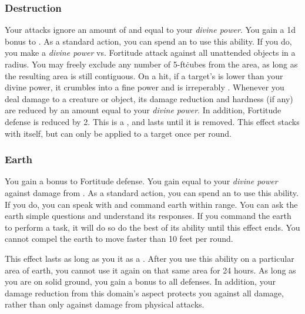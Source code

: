         \subsubsection{Destruction}
             Your attacks ignore an amount of  and  equal to your \textit{divine power}.
             You gain a \plus1d bonus to .
             As a standard action, you can spend an  to use this ability.
            If you do, you make a \textit{divine power} vs. Fortitude attack against all unattended objects in a \arealarge radius.
            You may freely exclude any number of 5-ft\. cubes from the area, as long as the resulting area is still contiguous.
            On a hit, if a target's  is lower than your divine power, it crumbles into a fine power and is irreperably .
             Whenever you deal damage to a creature or object, its damage reduction and hardness (if any) are reduced by an amount equal to your \textit{divine power}.
            In addition, Fortitude defense is reduced by 2.
            This is a , and lasts until it is removed.
            This effect stacks with itself, but can only be applied to a target once per round.

        \subsubsection{Earth}
             You gain a  bonus to Fortitude defense.
             You gain  equal to your \textit{divine power} against damage from .
             As a standard action, you can spend an  to use this ability.
            If you do, you can speak with and command earth within \rnglong range.
            You can ask the earth simple questions and understand its responses.
            If you command the earth to perform a task, it will do so do the best of its ability until this effect ends.
            You cannot compel the earth to move faster than 10 feet per round.

            This effect lasts as long as you  it as a .
            After you use this ability on a particular area of earth, you cannot use it again on that same area for 24 hours.
             As long as you are on solid ground, you gain a  bonus to all defenses.
            In addition, your damage reduction from this domain's aspect protects you against all damage, rather than only against damage from physical attacks.

